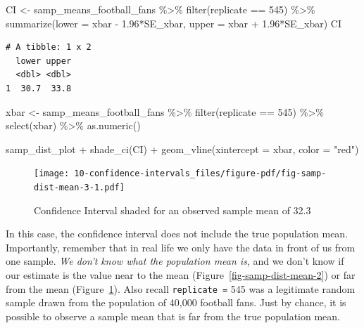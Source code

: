 \documentclass[
  letterpaper,
  DIV=11,
  numbers=noendperiod]{scrreprt}
\newenvironment{Shaded}{\begin{snugshade}}{\end{snugshade}}
\newcommand{\AttributeTok}[1]{\textcolor[rgb]{0.40,0.45,0.13}{#1}}
\newcommand{\DecValTok}[1]{\textcolor[rgb]{0.68,0.00,0.00}{#1}}
\newcommand{\FloatTok}[1]{\textcolor[rgb]{0.68,0.00,0.00}{#1}}
\newcommand{\FunctionTok}[1]{\textcolor[rgb]{0.28,0.35,0.67}{#1}}
\newcommand{\NormalTok}[1]{\textcolor[rgb]{0.00,0.23,0.31}{#1}}
\newcommand{\OtherTok}[1]{\textcolor[rgb]{0.00,0.23,0.31}{#1}}
\newcommand{\SpecialCharTok}[1]{\textcolor[rgb]{0.37,0.37,0.37}{#1}}
\newcommand{\StringTok}[1]{\textcolor[rgb]{0.13,0.47,0.30}{#1}}
\theoremstyle{definition}
\theoremstyle{remark}
\begin{document}
\begin{Shaded}
\begin{Highlighting}[]
\NormalTok{CI }\OtherTok{\textless{}{-}}\NormalTok{ samp\_means\_football\_fans }\SpecialCharTok{\%\textgreater{}\%} 
  \FunctionTok{filter}\NormalTok{(replicate }\SpecialCharTok{==} \DecValTok{545}\NormalTok{) }\SpecialCharTok{\%\textgreater{}\%} 
  \FunctionTok{summarize}\NormalTok{(}\AttributeTok{lower =}\NormalTok{ xbar }\SpecialCharTok{{-}} \FloatTok{1.96}\SpecialCharTok{*}\NormalTok{SE\_xbar,}
            \AttributeTok{upper =}\NormalTok{ xbar }\SpecialCharTok{+} \FloatTok{1.96}\SpecialCharTok{*}\NormalTok{SE\_xbar)}
\NormalTok{CI}
\end{Highlighting}
\end{Shaded}

\begin{verbatim}
# A tibble: 1 x 2
  lower upper
  <dbl> <dbl>
1  30.7  33.8
\end{verbatim}

\begin{Shaded}
\begin{Highlighting}[]
\NormalTok{xbar }\OtherTok{\textless{}{-}}\NormalTok{ samp\_means\_football\_fans }\SpecialCharTok{\%\textgreater{}\%} 
  \FunctionTok{filter}\NormalTok{(replicate }\SpecialCharTok{==} \DecValTok{545}\NormalTok{) }\SpecialCharTok{\%\textgreater{}\%} 
  \FunctionTok{select}\NormalTok{(xbar) }\SpecialCharTok{\%\textgreater{}\%} 
  \FunctionTok{as.numeric}\NormalTok{()}

\NormalTok{samp\_dist\_plot }\SpecialCharTok{+}
  \FunctionTok{shade\_ci}\NormalTok{(CI) }\SpecialCharTok{+}
  \FunctionTok{geom\_vline}\NormalTok{(}\AttributeTok{xintercept =}\NormalTok{ xbar, }\AttributeTok{color =} \StringTok{"red"}\NormalTok{)}
\end{Highlighting}
\end{Shaded}

\begin{figure}[H]

{\centering \texttt{[image: 10-confidence-intervals\_files/figure-pdf/fig-samp-dist-mean-3-1.pdf]}

}

\caption{\label{fig-samp-dist-mean-3}Confidence Interval shaded for an
observed sample mean of 32.3}

\end{figure}

In this case, the confidence interval does not include the true
population mean. Importantly, remember that in real life we only have
the data in front of us from one sample. \emph{We don't know what the
population mean is}, and we don't know if our estimate is the value near
to the mean (Figure~\ref{fig-samp-dist-mean-2}) or far from the mean
(Figure~\ref{fig-samp-dist-mean-3}). Also recall \texttt{replicate\ =}
545 was a legitimate random sample drawn from the population of 40,000
football fans. Just by chance, it is possible to observe a sample mean
that is far from the true population mean.
\end{document}
